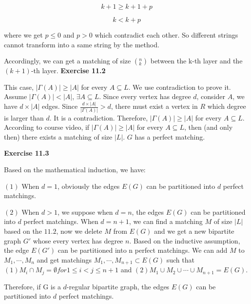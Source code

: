 \documentclass{article} %
\begin{document}
	 $$
	 k+1 \ge k+1+p
	 $$

	 $$
	 k<k+p
	 $$

	 where we get $p\leq 0$ and $p>0$ which contradict each other. So  different strings cannot transform into a same string by the method.\par
	
	 Accordingly, we can get a matching of size $(^n _k)$ between the k-th layer and the $(k+1)$-th layer.
\textbf{Exercise 11.2}\par
	This case, $|\Gamma(A)|\ge |A|$ for every $A\subseteq L$. We use contradiction to prove it.
	Assume $|\Gamma(A)|<|A|$, $\exists A\subseteq L$. Since every vertex has degree $d$, consider $A$, we have $d\times |A|$ edges.
	Since $\frac{d\times|A|}{|\Gamma(A)|}>d$, there must exist a vertex in $R$ which degree is larger than $d$. It is a contradiction.
	Therefore, $|\Gamma(A)|\ge |A|$ for every $A\subseteq L$. According to course video, if $|\Gamma(A)|\ge |A|$ for every $A\subseteq L$,
	then (and only then) there exists a matching of size $|L|$. $G$ has a perfect matching.\par 	


\textbf{Exercise 11.3}\par
    Based on the mathematical induction, we have:\par
    $(1)$ When $d=1$, obviously the edges $E(G)$ can be partitioned into $d$ perfect matchings.\par
    $(2)$ When $d>1$, we suppose when $d=n$, the edges $E(G)$ can be partitioned into $d$ perfect matchings. When $d=n+1$, we can find a matching $M$ of size $|L|$ based on the $11.2$, now we delete $M$ from $E(G)$ and we get a new bipartite graph $G\prime$ whose every vertex has degree $n$. Based on the inductive assumption, the edge $E(G\prime)$ can be partitioned into n perfect matchings. We can add $M$ to $M_1,\cdots,M_n$ and get matchings $M_1,\cdots,M_{n+1} \subset E(G)$ such that $(1) M_i \cap M_j = \emptyset for 1\leq i<j\leq n+1$ and $(2) M_1\cup M_2 \cup\cdots\cup M_{n+1} = E(G)$.\par
    Therefore, if G is a $d$-regular bipartite graph, the edges $E(G)$ can be partitioned into $d$ perfect matchings.
\end{document}
